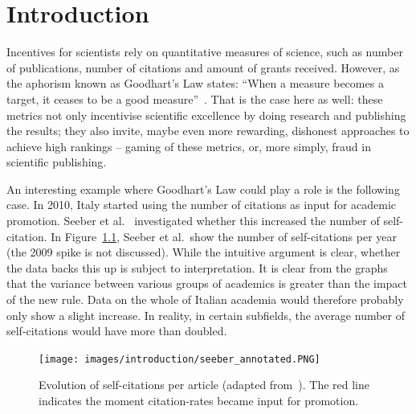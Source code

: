 \documentclass{ou-report}
\newcommand{\outline}[1]{{\color{blue} #1}}
\begin{document}
\chapter{Introduction}
Incentives for scientists rely on quantitative measures of science, such as 
number of publications, number of citations and amount of grants received. 
However, as the aphorism known as Goodhart's Law states: ``When a measure 
becomes a target, it ceases to be a good measure''~\cite{strathern_1997}. That 
is the case here as well: these metrics not only incentivise scientific 
excellence by doing research and publishing the results; they also invite, 
maybe even more rewarding, dishonest approaches to achieve high rankings 
-- gaming of these metrics, or, more simply, fraud in scientific publishing. 

An interesting example where Goodhart's Law could play a role is the following
case. In 2010, Italy started using the number of citations as input for academic
promotion. Seeber et al.~\cite{SEEBER2019478} investigated whether this increased
the number of  self-citation. In Figure~\ref{fig:seeber}, Seeber et
al.~show the number of self-citations per year (the 2009 spike is not discussed).
While the intuitive argument is clear, whether the data backs this up is subject
to interpretation. It is clear from the graphs that the variance between various
groups of academics is greater than the impact of the new rule. Data on the whole
of Italian academia would therefore probably only show a slight increase. In
reality, in certain subfields, the average number of self-citations would have more
than doubled.

\begin{figure}[H]
\centering
\texttt{[image: images/introduction/seeber\_annotated.PNG]}
\caption{Evolution of self-citations per article (adapted from~\cite{SEEBER2019478}).
    The red line indicates the moment citation-rates became input for promotion.}
\label{fig:seeber}
\end{figure}
\end{document}
